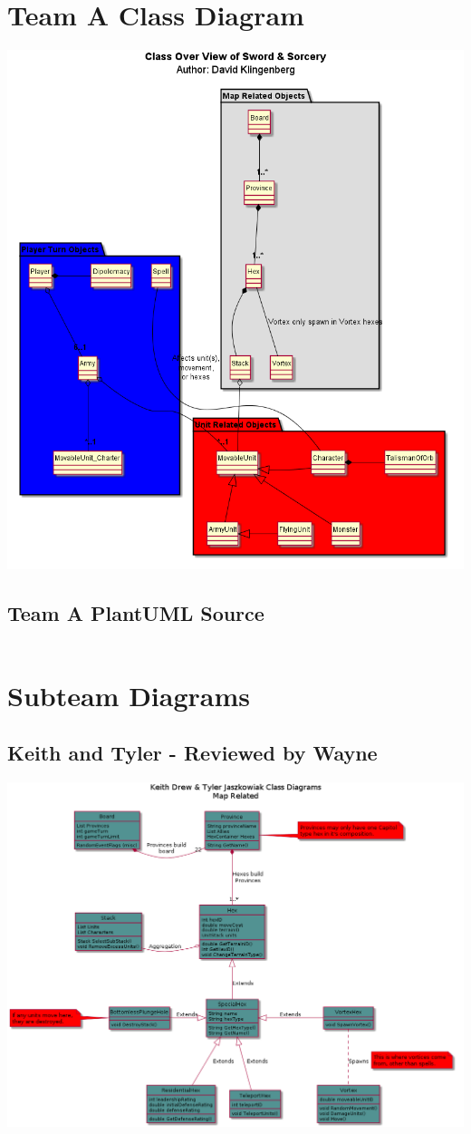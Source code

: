 \documentclass[12pt,a4paper]{article}
\begin{document}
\section{Team A Class Diagram}
\includegraphics[width=\textwidth]{TeamAClassOverView}
\pagebreak
\subsection{Team A PlantUML Source}
\begin{verbatim}

\end{verbatim}

\section{Subteam Diagrams}
\subsection{Keith and Tyler - Reviewed by Wayne}
\includegraphics[width=\textwidth]{classD}
\end{document}
